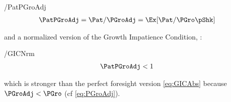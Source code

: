 \documentclass[BufferStockTheory]{subfiles}
\begin{document}
\begin{verbatimwrite}{\EqDir/PatPGroAdj}
  \begin{align}
    \PatPGroAdj  & = \Pat/\PGroAdj = \Ex[\Pat/\PGro\pShk]  \label{eq:GPFNrm} 
  \end{align}
\end{verbatimwrite}

\begin{comment}
and the proof of Theorem~\ref{thm:balance} below yields the conclusion that
\begin{align*}
  \lim_{\mRat_{t} \rightarrow \infty} \Ex_{t}[\mRat_{t+1}/\mRat_{t}]  & = \PatPGroAdj,
\end{align*}
which implies that if we wish to prevent $\mRat$ from heading to infinity (that is, if we want $\mRat$ to be expected to fall for some large enough value of $m$) we must impose a modified version of the Growth Impatience Condition \eqref{eq:GICAbs}; we call the `Normalized Growth Impatience Condition' (\GICNrm) the requirement that the Normalized Growth Patience Factor~\eqref{eq:GPFNrm} must be less than 1:\footnote{Under our assumption that $\CRRA>1$, equation \eqref{eq:GICNrm} is a bit easier to satisfy than the similar condition imposed by Deaton~\citeyearpar{deatonLiqConstr}: $\left(\Ex[\pShk^{-\CRRA}]\right)^{1/\CRRA} \PatPGro < 1$ to guarantee that his problem defined a contraction mapping.}
\end{comment}
and a normalized version of the Growth Impatience Condition, {\GICNrm}:
\begin{verbatimwrite}{\EqDir/GICNrm}
  \begin{align}
    \PatPGroAdj  & < 1 \label{eq:GICNrm}
  \end{align}\end{verbatimwrite}

which is stronger than the perfect foresight version \eqref{eq:GICAbs} because $\PGroAdj < \PGro$ (cf \eqref{eq:PGroAdj}).
\begin{comment}
\begin{align}
  \PGroAdj & < \PGro \label{eq:PGroAdjLTPGro}.
\end{align}
\end{comment}

\hypertarget{Autarky-Value}{}
\end{document}
